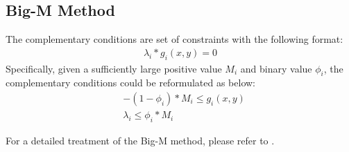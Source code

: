 \subsection{Big-M Method}
The complementary conditions are set of constraints with the following format:\\
\begin{align}
\lambda_i*g_i(x,y) =0 \nonumber
\end{align}
Specifically, given a sufficiently large positive value $M_i$ and binary value $\phi_i$, the complementary conditions could be reformulated as below:
\begin{align}
&-(1-\phi_i)*M_i\leq g_i(x,y)\nonumber\\
&\lambda_i\leq\phi_i*M_i\nonumber
\end{align}

For a detailed treatment of the Big-M method, please refer to \cite{winston2003introduction}.


